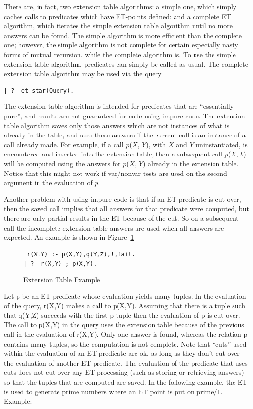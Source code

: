 There are, in fact, two extension table algorithms: a simple one,
which simply caches calls to predicates which have ET-points defined;
and a complete ET algorithm,
which iterates the simple extension table algorithm until
no more answers can be found.
The simple algorithm is more efficient than the complete one;
however, the simple algorithm is not complete for certain
especially nasty forms of mutual recursion, while the complete algorithm is.
To use the simple extension table algorithm,
predicates can simply be called as usual.
The complete extension table algorithm may be used via the query
\begin{center}
{\tt | ?- et\_star(Query).}
\end{center}

The extension table algorithm is intended for predicates that are ``essentially
pure'', and results are not guaranteed for code using impure code.
The extension table algorithm saves only those answers which are
not instances of what is already in the
table, and uses these answers if the current call is an instance of a call
already made.
For example, if a call $p$($X$, $Y$), with $X$ and $Y$ uninstantiated,
is encountered and inserted into the extension table,
then a subsequent call $p$($X$, $b$) will be computed using the answers for
$p$($X$, $Y$) already in the extension table.
Notice that this might not work if var/nonvar tests are used
on the second argument in the evaluation of $p$.

Another problem with using impure code is that if an ET predicate is cut over,
then the saved call implies that all answers for that predicate were computed,
but there are only partial results in the ET because of the cut.
So on a subsequent call the incomplete extension table answers are used
when all answers are expected.
An example is shown in Figure~\ref{impure_code}
\begin{figure}[htbp]
{\centering
\begin{tabbing}\tt
	r(X,Y) :- p(X,Y),q(Y,Z),!,fail. \\
	\tt | ?-  r(X,Y) ; p(X,Y).
\end{tabbing}
\caption{Extension Table Example}}\label{impure_code}
\end{figure}

Let p be an ET predicate whose evaluation yields many tuples.
In the evaluation of the query, r(X,Y) makes a call to p(X,Y).
Assuming that there is a tuple such that q(Y,Z) succeeds with the
first p tuple then the evaluation of p is cut over.
The call to p(X,Y) in the query uses the extension table because
of the previous call in the evaluation of r(X,Y).
Only one answer is found, whereas the relation p contains many tuples,
so the computation is not complete.
Note that ``cuts'' used within the evaluation of an ET predicate are ok,
as long as they don't cut over the evaluation of another ET predicate.
The evaluation of the predicate that uses cuts does not cut over any ET
processing (such as storing or retrieving answers) so that the tuples that
are computed are saved.
In the following example, the ET is used to generate prime numbers
where an ET point is put on prime/1.
Example:

